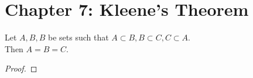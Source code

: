 \section{Chapter 7: Kleene's Theorem}
\begin{theorem}
    Let \(A,B,B\) be sets such that \(A \subset B, B \subset C, C \subset A\).\\
    Then \(A=B=C\).
\end{theorem}
\begin{proof}
    
\end{proof}